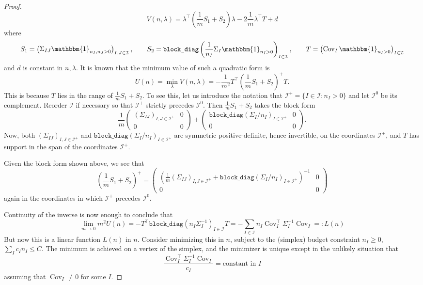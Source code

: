 \documentclass{article} %
\DeclareMathOperator{\Cov}{Cov}
\newcommand{\I}{\mathbbm{1}}
\begin{document}
\begin{proof}
\[
V(n,\lambda) = \lambda^\top \left(\frac{1}{m}S_1 + S_2\right)\lambda - 2\frac{1}{m}\lambda^\top T + d
\]
where
\[
S_1 = \begin{pmatrix}
    \Sigma_{IJ} \I_{n_I,n_J>0}
\end{pmatrix}_{I,J\in\mathcal{I}},\quad\quad S_2 = \texttt{block\_diag}\left(\frac{1}{n_I}\Sigma_I \I_{n_I>0}\right)_{I\in\mathcal{I}},\quad\quad T = \begin{pmatrix}
    \Cov_{I}\I_{n_I>0}
\end{pmatrix}_{I\in\mathcal{I}}
\]
and $d$ is constant in $n,\lambda$. It is known that the minimum value of such a quadratic form is
\[
U(n) = \min_\lambda V(n,\lambda) = -\frac{1}{m^2}T^\top \left(\frac{1}{m}S_1+S_2\right)^+T.
\]
This is because $T$ lies in the range of $\frac{1}{m}S_1+S_2$. To see this, let us introduce the notation that $\mathcal{I}^+=\{I\in\mathcal{I}:n_I>0\}$ and let $\mathcal{I}^0$ be its complement. Reorder $\mathcal{I}$ if necessary so that $\mathcal{I}^+$ strictly precedes $\mathcal{I}^0$. Then $\frac{1}{m} S_1+S_2$ takes the block form
\[
\frac{1}{m}\begin{pmatrix}
    (\Sigma_{IJ})_{I,J\in\mathcal{I}^+} & 0 \\
    0 & 0
\end{pmatrix} + \begin{pmatrix}
    \texttt{block\_diag}(\Sigma_I/n_I)_{I\in\mathcal{I}^+} & 0 \\
    0 & 0
\end{pmatrix}.
\]
Now, both $(\Sigma_{IJ})_{I,J\in\mathcal{I}^+}$ and $\texttt{block\_diag}(\Sigma_I/n_I)_{I\in\mathcal{I}^+}$ are symmetric positive-definite, hence invertible, on the coordinates $\mathcal{I}^+$, and $T$ has support in the span of the coordinates $\mathcal{I}^+$.

Given the block form shown above, we see that
\[
\left(\frac{1}{m}S_1 + S_2\right)^+ = \begin{pmatrix}
    \left(\frac{1}{m}(\Sigma_{IJ})_{I,J\in\mathcal{I}^+}+\texttt{block\_diag}(\Sigma_I/n_I)_{I\in\mathcal{I}^+}\right)^{-1} & 0 \\
    0 & 0
\end{pmatrix}
\]
again in the coordinates in which $\mathcal{I}^+$ precedes $\mathcal{I}^0$.

Continuity of the inverse is now enough to conclude that
\[
\lim_{m\to0} m^2U(n) = -T^\top\texttt{block\_diag}\left(n_I\Sigma_I^{-1}\right)_{I\in\mathcal{I}}  T = -\sum_{I\in\mathcal{I}} n_I \Cov_I^\top\Sigma_I^{-1}\Cov_I =: L(n)
\]
But now this is a linear function $L(n)$ in $n$. Consider minimizing this in $n$, subject to the (simplex) budget constraint $n_I\geq0$, $\sum_I c_In_I\leq C$. The minimum is achieved on a vertex of the simplex, and the minimizer is unique except in the unlikely situation that
\[
\frac{\Cov_I^\top\Sigma_I^{-1}\Cov_I}{c_I} = \text{constant in $I$}
\]
assuming that $\Cov_I\neq0$ for some $I$.


\end{proof}
\end{document}
